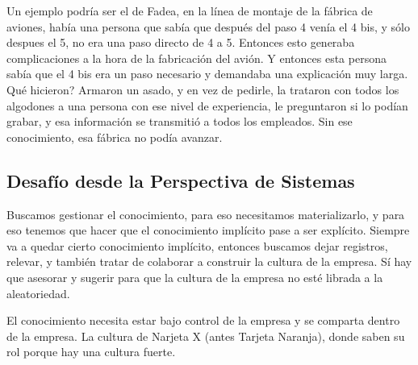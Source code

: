 Un ejemplo podría ser el de Fadea, en la línea de montaje de la fábrica
de aviones, había una persona que sabía que después del paso 4 venía el
4 bis, y sólo despues el 5, no era una paso directo de 4 a 5. Entonces
esto generaba complicaciones a la hora de la fabricación del avión. Y
entonces esta persona sabía que el 4 bis era un paso necesario y
demandaba una explicación muy larga. Qué hicieron? Armaron un asado, y
en vez de pedirle, la trataron con todos los algodones a una persona con
ese nivel de experiencia, le preguntaron si lo podían grabar, y esa
información se transmitió a todos los empleados. Sin ese conocimiento,
esa fábrica no podía avanzar.

\bigskip

\hypertarget{desafuxedo-desde-la-perspectiva-de-sistemas}{%
\subsection{Desafío desde la Perspectiva de
Sistemas}\label{desafuxedo-desde-la-perspectiva-de-sistemas}}

Buscamos gestionar el conocimiento, para eso necesitamos materializarlo,
y para eso tenemos que hacer que el conocimiento implícito pase a ser
explícito. Siempre va a quedar cierto conocimiento implícito, entonces
buscamos dejar registros, relevar, y también tratar de colaborar a
construir la cultura de la empresa. Sí hay que asesorar y sugerir para
que la cultura de la empresa no esté librada a la aleatoriedad.

El conocimiento necesita estar bajo control de la empresa y se comparta
dentro de la empresa. La cultura de Narjeta X (antes Tarjeta Naranja), donde saben su rol
porque hay una cultura fuerte.

